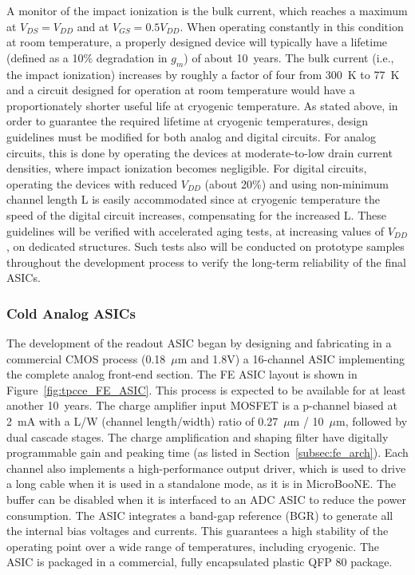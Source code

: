 A monitor of the impact ionization is the bulk current, which reaches a maximum at $V_{DS} = V_{DD}$ and at $V_{GS} = 0.5 V_{DD}$.
When operating constantly in this condition at room temperature, a properly designed device 
will typically have a lifetime (defined as a 10\% degradation in $g_m$) of about 10~years. 
The bulk current (i.e., the impact ionization) increases by roughly a factor of four from 300~K to 77~K 
\cite{CMOS-reliability} and a circuit designed for operation at room temperature would have 
a proportionately shorter useful life at cryogenic temperature. As stated above, in order to guarantee 
the required lifetime at cryogenic temperatures, design guidelines must be modified for both analog 
and digital circuits. For analog circuits, this is done by operating the devices at moderate-to-low 
drain current densities, where impact ionization becomes negligible. 
%
For digital circuits, 
operating the devices with reduced $V_{DD}$ (about 20\%) and using non-minimum channel length L
is easily accommodated since at cryogenic temperature the speed of the digital circuit increases, 
compensating for the increased L.
%
These guidelines will be verified with accelerated aging tests, 
at increasing values of $V_{DD}$, on dedicated structures. Such tests also will be conducted on 
prototype samples throughout the development process to verify the long-term reliability of the final ASICs.

%
\subsubsection{Cold Analog ASICs}
\label{subsubsec:fe_CMOS_analog}

The development of the readout ASIC began by designing and fabricating in a commercial CMOS
process (0.18~$\mu$m and 1.8V) a 16-channel ASIC implementing the complete analog front-end section.
The FE ASIC layout is shown in Figure~\ref{fig:tpcce_FE_ASIC}.
This process is expected to be available for at least another 10~years. 
The charge amplifier input MOSFET is a p-channel biased at 2~mA with a L/W (channel length/width) ratio
of 0.27~$\mu$m / 10~$\mu$m, followed by dual cascade stages.
The charge amplification and shaping filter have digitally programmable gain and peaking time
(as listed in Section~\ref{subsec:fe_arch}).
Each channel also implements a high-performance output driver,
which is used to drive a long cable when it is used in a standalone mode, as it is in MicroBooNE.\cite{microboone-url}
The buffer can be disabled when it is interfaced to an ADC ASIC to reduce the power consumption.
The ASIC integrates a band-gap reference (BGR) to generate all the internal bias voltages and currents.
This guarantees a high stability of the operating point over a wide range of
temperatures, including cryogenic.
The ASIC is packaged in a commercial, fully encapsulated plastic QFP 80 package.

